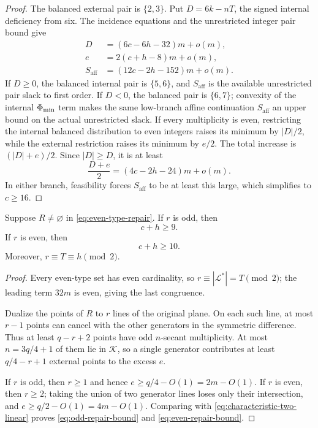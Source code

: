\begin{proof}
The balanced external pair is \(\{2,3\}\).  Put \(D=6k-nT\), the signed
internal deficiency from six.  The incidence equations and the unrestricted
integer pair bound give
\begin{align*}
 D&=(6c-6h-32)m+o(m),\\
 e&=2(c+h-8)m+o(m),\\
 S_{\mathrm{aff}}&=(12c-2h-152)m+o(m).
\end{align*}
If \(D\ge0\), the balanced internal pair is \(\{5,6\}\), and
\(S_{\mathrm{aff}}\) is the available unrestricted pair slack to first
order.  If \(D<0\), the balanced pair is \(\{6,7\}\); convexity of the
internal \(\Phi_{\min}\) term makes the same low-branch affine continuation
\(S_{\mathrm{aff}}\) an upper bound on the actual unrestricted slack.
If every multiplicity is even, restricting the internal balanced distribution
to even integers raises its minimum by \(|D|/2\), while the external
restriction raises its minimum by \(e/2\).  The total increase is
\((|D|+e)/2\).  Since \(|D|\ge D\), it is at least
\[
 \frac{D+e}{2}=(4c-2h-24)m+o(m).
\]
In either branch, feasibility forces \(S_{\mathrm{aff}}\) to be at least this
large, which simplifies to \(c\ge16\).
\end{proof}

\begin{lemma}\label{lem:repair-parity}
Suppose \(R\ne\varnothing\) in \eqref{eq:even-type-repair}.  If \(r\) is
odd, then
\begin{equation}\label{eq:odd-repair-bound}
 c+h\ge9.
\end{equation}
If \(r\) is even, then
\begin{equation}\label{eq:even-repair-bound}
 c+h\ge10.
\end{equation}
Moreover, \(r\equiv T\equiv h\pmod2\).
\end{lemma}

\begin{proof}
Every even-type set has even cardinality, so
\(r\equiv|\mathcal L^*|=T\pmod2\); the leading term \(32m\) is even, giving
the last congruence.

Dualize the points of \(R\) to \(r\) lines of the original plane.  On each
such line, at most \(r-1\) points can cancel with the other generators in the
symmetric difference.  Thus at least \(q-r+2\) points have odd
\(n\)-secant multiplicity.  At most \(n=3q/4+1\) of them lie in
\(\mathcal K\), so a single generator contributes at least
\(q/4-r+1\) external points to the excess \(e\).

If \(r\) is odd, then \(r\ge1\) and hence \(e\ge q/4-O(1)=2m-O(1)\).
If \(r\) is even, then \(r\ge2\); taking the union of two generator lines
loses only their intersection, and \(e\ge q/2-O(1)=4m-O(1)\).  Comparing
with \eqref{eq:characteristic-two-linear} proves
\eqref{eq:odd-repair-bound} and \eqref{eq:even-repair-bound}.
\end{proof}


